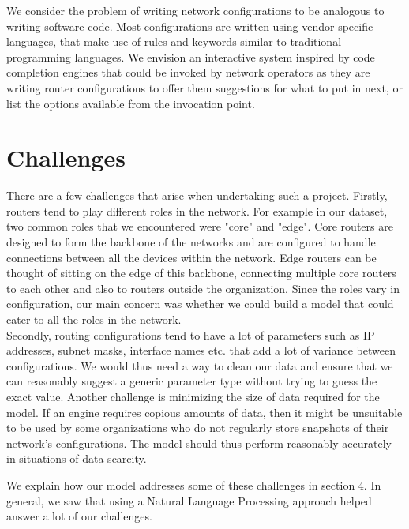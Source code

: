\documentclass[../thesis.tex]{subfiles}
\begin{document}
We consider the problem of writing network configurations to be analogous to writing software code. Most configurations are written using vendor specific languages, that make use of rules and keywords similar to traditional programming languages. We envision an interactive system inspired by code completion engines that could be invoked by network operators as they are writing router configurations to offer them suggestions for what to put in next, or list the options available from the invocation point. 

\section{Challenges}
There are a few challenges that arise when undertaking such a project. Firstly, routers tend to play different roles in the network. For example in our dataset, two common roles that we encountered were "core" and "edge". Core routers are designed to form the backbone of the networks and are configured to handle connections between all the devices within the network. Edge routers can be thought of sitting on the edge of this backbone, connecting multiple core routers to each other and also to routers outside the organization. Since the roles vary in configuration, our main concern was whether we could build a model that could cater to all the roles in the network.\\

Secondly, routing configurations tend to have a lot of parameters such as IP addresses, subnet masks, interface names etc. that add a lot of variance between configurations. We would thus need a way to clean our data and ensure that we can reasonably suggest a generic parameter type without trying to guess the exact value. Another challenge is minimizing the size of data required for the model. If an engine requires copious amounts of data, then it might be unsuitable to be used by some organizations who do not regularly store snapshots of their network's configurations. The model should thus perform reasonably accurately in situations of data scarcity. 

We explain how our model addresses some of these challenges in section 4. In general, we saw that using a Natural Language Processing approach helped answer a lot of our challenges.
\end{document}
